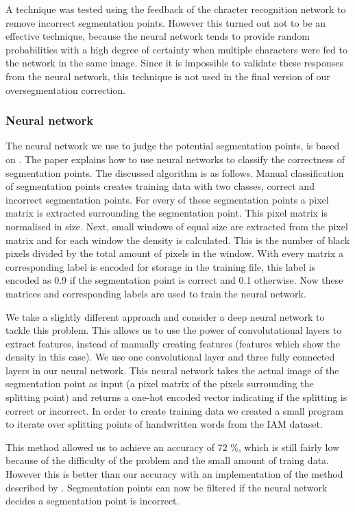\documentclass{article}
\begin{document}
A technique was tested using the feedback of the chracter recognition network to remove incorrect segmentation points.
However this turned out not to be an effective technique, because the neural network tends to provide random probabilities with a high degree of certainty when multiple characters were fed to the network in the same image.
Since it is impossible to validate these responses from the neural network, this technique is not used in the final version of our oversegmentation correction.

\subsubsection{Neural network}
The neural network we use to judge the potential segmentation points, is based on \citep{evalsplitpointsnn}. The paper explains how to use neural networks to classify the correctness of segmentation points. The discussed algorithm is as follows. Manual classification of segmentation points creates training data with two classes, correct and incorrect segmentation points.
For every of these segmentation points a pixel matrix is extracted surrounding the segmentation point. This pixel matrix is normalised in size.
Next, small windows of equal size are extracted from the pixel matrix and for each window the density is calculated. This is the number of black pixels divided by the total amount of pixels in the window.
With every matrix a corresponding label is encoded for storage in the training file, this label is encoded as 0.9 if the segmentation point is correct and 0.1 otherwise. Now these matrices and corresponding labels are used to train the neural network.

We take a slightly different approach and consider a deep neural network to tackle this problem. This allows us to use the power of convolutational layers to extract features, instead of manually creating features (features which show the density in this case).
We use one convolutional layer and three fully connected layers in our neural network. This neural network takes the actual image of the segmentation point as input (a pixel matrix of the pixels surrounding the splitting point) and returns a one-hot encoded vector indicating if the splitting is correct or incorrect. In order to create training data we created a small program to iterate over splitting points of handwritten words from the IAM dataset. \citep{iam}

This method allowed us to achieve an accuracy of 72 \%, which is still fairly low because of the difficulty of the problem and the small amount of traing data. However this is better than our accuracy with an implementation of the method described by \citep{evalsplitpointsnn}.
Segmentation points can now be filtered if the neural network decides a segmentation point is incorrect.
\end{document}
